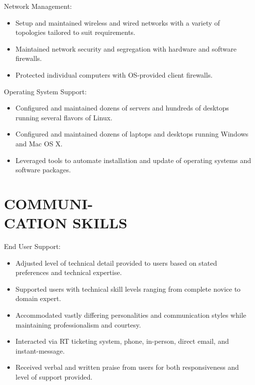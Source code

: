 \documentclass[line,margin]{res}
\begin{document}
\begin{resume}
    Network Management:
    \vspace{2 mm}
    \begin{itemize} \itemsep -1pt %
        \item Setup and maintained wireless and wired networks with a
        variety of topologies tailored to suit requirements.
        \item Maintained network security and segregation with hardware
        and software firewalls.
        \item Protected individual computers with OS-provided client
        firewalls.
    \end{itemize}

    Operating System Support:
    \vspace{2 mm}
    \begin{itemize} \itemsep -1pt %
        \item Configured and maintained dozens of servers and hundreds of
        desktops running several flavors of Linux.
        \item Configured and maintained dozens of laptops and desktops
        running Windows and Mac OS X.
        \item Leveraged tools to automate installation and update of
        operating systems and software packages.
    \end{itemize}


\section{COMMUNI- \\ CATION SKILLS}

    End User Support:
    \vspace{2 mm}
    \begin{itemize} \itemsep -1pt %
        \item Adjusted level of technical detail provided to users based
        on stated preferences and technical expertise.
        \item Supported users with technical skill levels ranging from
        complete novice to domain expert.
        \item Accommodated vastly differing personalities and communication
        styles while maintaining professionalism and courtesy.
        \item Interacted via RT ticketing system, phone, in-person, direct
        email, and instant-message.
        \item Received verbal and written praise from users for both
        responsiveness and level of support provided.
    \end{itemize}


\end{resume}
\end{document}
